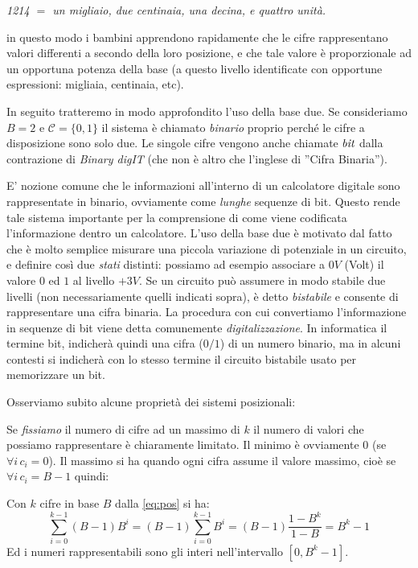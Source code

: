 {\it 1214 $ = $ un migliaio, due centinaia, una decina, e quattro unità.}

\noindent in questo modo i bambini apprendono rapidamente che le cifre
rappresentano valori differenti a secondo della loro posizione, e che tale
valore è proporzionale ad un opportuna potenza della base (a questo livello
identificate con opportune espressioni: migliaia, centinaia, etc).

In seguito tratteremo in modo approfondito l'uso della base due. Se consideriamo $B = 2$ e $\mathcal{C} = \{ 0, 1 \}$ il sistema è
chiamato \emph{binario} proprio perché le cifre a disposizione sono solo due.
Le singole cifre vengono anche chiamate $\emph{bit}$ dalla contrazione di
\emph{Binary digIT} (che non è altro che l'inglese di ''Cifra
Binaria'').

E' nozione comune che le informazioni all'interno di un calcolatore digitale
sono rappresentate in binario, ovviamente come \emph{lunghe} sequenze di bit.
Questo rende tale sistema importante per la comprensione di come viene
codificata l'informazione dentro un calcolatore. L'uso della base due è
motivato dal fatto che è molto semplice misurare una piccola variazione di
potenziale in un circuito, e definire così due \emph{stati} distinti: possiamo
ad esempio associare a $0V$ (Volt) il valore $0$ ed $1$ al livello $+3V$. Se
un circuito può assumere in modo stabile due livelli (non necessariamente
quelli indicati sopra), è detto \emph{bistabile} e consente di rappresentare
una cifra binaria. La procedura con cui convertiamo l'informazione in sequenze
di bit viene detta comunemente \emph{digitalizzazione}. In informatica il
termine bit, indicherà quindi una cifra ($0/1$) di un numero binario, ma in
alcuni contesti si indicherà con lo stesso termine il circuito bistabile usato
per memorizzare un bit.

Osserviamo subito alcune proprietà dei sistemi posizionali: 

Se \emph{fissiamo} il numero di cifre ad un massimo di $k$ il numero di valori che possiamo rappresentare è chiaramente limitato. Il minimo è ovviamente $0$ (se $\forall i \, c_i = 0$). Il massimo si ha quando ogni  cifra assume il valore massimo, cioè se $\forall i\, c_i = B-1$ quindi:

\begin{observe}
Con $k$ cifre in base $B$ dalla \eqref{eq:pos} si ha:
\begin{equation}\label{eq:range} \sum_{i=0}^{k-1} (B-1)B^i = (B-1)
\sum_{i=0}^{k-1} B^i = (B-1) \frac{1-B^k}{1-B} = B^k-1 \end{equation}
Ed i numeri rappresentabili sono gli interi nell'intervallo $[0,B^k-1]$.
\end{observe}

